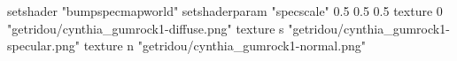 setshader "bumpspecmapworld"
setshaderparam "specscale" 0.5 0.5 0.5
texture 0 "getridou/cynthia_gumrock1-diffuse.png"
texture s "getridou/cynthia_gumrock1-specular.png"
texture n "getridou/cynthia_gumrock1-normal.png"
